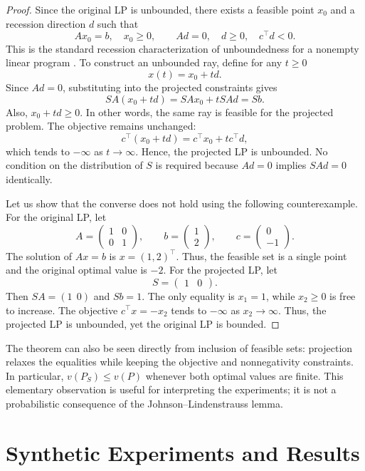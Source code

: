 \documentclass[12pt,letterpaper,oneside]{report}
\theoremstyle{definition}
\begin{document}
\begin{proof}
Since the original LP is unbounded, there exists a feasible point $x_0$
and a recession direction $d$ such that
\[
Ax_0=b,\quad x_0\geq0,\qquad
Ad=0,\quad d\geq0,\quad c^\top d<0.
\]
This is the standard recession characterization of unboundedness for a
nonempty linear program \cite{vanderbei2020}.
To construct an unbounded ray, define for any $t\geq0$
\[
x(t)=x_0+td.
\]
Since $Ad=0$, substituting into the projected constraints gives
\[
SA(x_0+td)=SAx_0+tSAd=Sb.
\]
Also, $x_0+td\geq0$. In other words, the same ray is feasible for the
projected problem. The objective remains unchanged:
\[
c^\top(x_0+td)=c^\top x_0+t c^\top d,
\]
which tends to $-\infty$ as $t\to\infty$. Hence, the projected LP is
unbounded. No condition on the distribution of $S$ is required because
$Ad=0$ implies $SAd=0$ identically.

Let us show that the converse does not hold using the following
counterexample. For the original LP, let
\[
A=\begin{pmatrix}1&0\\0&1\end{pmatrix},\qquad
b=\begin{pmatrix}1\\2\end{pmatrix},\qquad
c=\begin{pmatrix}0\\-1\end{pmatrix}.
\]
The solution of $Ax=b$ is $x=(1,2)^\top$. Thus, the feasible set is a
single point and the original optimal value is $-2$.
For the projected LP, let
\[
S=\begin{pmatrix}1&0\end{pmatrix}.
\]
Then $SA=(1\ \ 0)$ and $Sb=1$. The only equality is $x_1=1$, while
$x_2\geq0$ is free to increase. The objective $c^\top x=-x_2$ tends to
$-\infty$ as $x_2\to\infty$. Thus, the projected LP is unbounded, yet
the original LP is bounded.
\end{proof}

The theorem can also be seen directly from inclusion of feasible sets:
projection relaxes the equalities while keeping the objective and
nonnegativity constraints. In particular, $v(P_S)\leq v(P)$ whenever
both optimal values are finite. This elementary observation is useful for
interpreting the experiments; it is not a probabilistic consequence of
the Johnson--Lindenstrauss lemma.

\chapter{Synthetic Experiments and Results}\label{chap:experiments}
\end{document}
